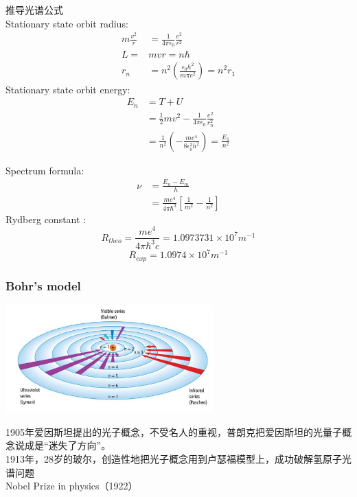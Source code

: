 \begin{frame}   
    \frametitle{}
    推导光谱公式\\
    {\Bullet} Stationary state orbit radius:
    \begin{equation*}
        \begin{split}
            m\frac{v^2}{r}&=\frac{1}{4\pi\epsilon_0} \frac{e^2}{r^2} \\
            L=&mvr =n\hbar \\
            r_n&= n^2 (\frac{\epsilon_0 h^2}{m\pi e^2}) =n^2 r_1   
        \end{split} 
     \end{equation*}
     {\Bullet} Stationary state orbit energy: 
     \begin{equation*}
        \begin{split}
            E_n &= T + U \\
            &= \frac{1}{2}mv^2- \frac{1}{4\pi\epsilon_0} \frac{e^2}{r_n ^2} \\
            &= \frac{1}{n^2} (-\frac{m e^4}{8 \epsilon_0 ^2 h^2}) = \frac{E_1}{n^2}
        \end{split}  
     \end{equation*}
\end{frame}

\begin{frame}
    {\Bullet} Spectrum formula: 
    \begin{equation*}
        \begin{split}
         \nu&=\frac{E_n -E_m}{h} \\
         &= \frac{m e^4}{4\pi \hbar ^3} [\frac{1}{m^2} -\frac{1}{n^2}]
        \end{split}  
     \end{equation*}
     {\Bullet} Rydberg constant : 
     \[R_{theo}= \frac{m e^4}{4\pi \hbar ^3 c} =1.0973731\times 10^7 m^{-1}\]
    \[R_{exp}=1.0974\times10^7 m^{-1} \]  
\end{frame}

\begin{frame}   
    \frametitle{Bohr's model}  
    \begin{center}
        \includegraphics[width=0.6\textwidth]{figs/bohratom.png}
    \end{center}  
    {\Bullet} 1905年爱因斯坦提出的光子概念，不受名人的重视，普朗克把爱因斯坦的光量子概念说成是“迷失了方向”。\\
    {\Bullet} 1913年，28岁的玻尔，创造性地把光子概念用到卢瑟福模型上，成功破解氢原子光谱问题 \\
    {\color{deepred} {\Bullet} Nobel Prize in physics（1922）}\\ 
\end{frame}


